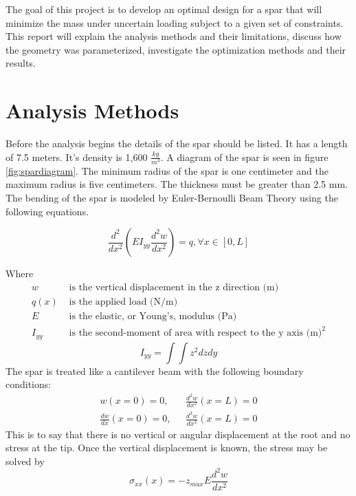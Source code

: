 \documentclass[12pt]{article}
\begin{document}
	The goal of this project is to develop an optimal design for a spar that will minimize the mass under uncertain loading subject to a given set of constraints. This report will explain the analysis methods and their limitations, discuss how the geometry was parameterized, investigate the optimization methods and their results.
	
	

	
	
	\section{Analysis Methods}	
	Before the analysis begins the details of the spar should be listed. It has a length of 7.5 meters. It's density is 1,600 $\frac{kg}{m^3}$\cite{Hicken18Proj}. A diagram of the spar is seen in figure \ref{fig:spardiagram}. The minimum radius of the spar is one centimeter and the maximum radius is five centimeters. The thickness must be greater than 2.5 mm. The bending of the spar is modeled by Euler-Bernoulli Beam Theory using the following equations\cite{Hicken18}.
	
	\begin{equation}
	\frac{d^2}{dx^2}\left(EI_{yy}\frac{d^2 w}{dx^2}\right)=q,  \forall x\in[0,L]
	\end{equation}
	
	Where 
	\begin{align}
	w& \text{ is the vertical displacement in the z direction (m)}\nonumber\\
	q(x)& \text{ is the applied load (N/m)}\nonumber\\
	E& \text{ is the elastic, or Young’s, modulus (Pa)}\nonumber\\
	I_{yy}& \text{ is the second-moment of area with respect to the y axis }\text{(m)}^2\nonumber
	\end{align}
	\begin{equation}
	I_{yy}=\int \int z^2 dz dy
	\end{equation}
	The spar is treated like a cantilever beam with the following boundary conditions:
	\begin{align}
	w(x=0)=0,&\text{   } \frac{d^2w}{dx^2}(x=L)=0\\
	\frac{dw}{dx}(x=0)=0,&\text{   }\frac{d^3w}{dx^3}(x=L)=0
	\end{align}
	This is to say that there is no vertical or angular displacement at the root and no stress at the tip. Once the vertical displacement is known, the stress may be solved by
	\begin{equation}
\sigma_{xx} (x)=-z_{max}E\frac{d^2w}{dx^2}
	\end{equation}
	
\end{document}
